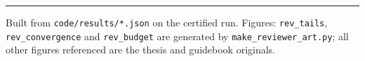 \documentclass[11pt,a4paper]{article}
\begin{document}
\vspace{18pt}
\hrule
\vspace{8pt}
{\footnotesize\color{dim}
Built from \texttt{code/results/*.json} on the certified run. Figures:
\texttt{rev\_tails}, \texttt{rev\_convergence} and \texttt{rev\_budget} are
generated by \texttt{make\_reviewer\_art.py}; all other figures referenced are
the thesis and guidebook originals.}
\end{document}
